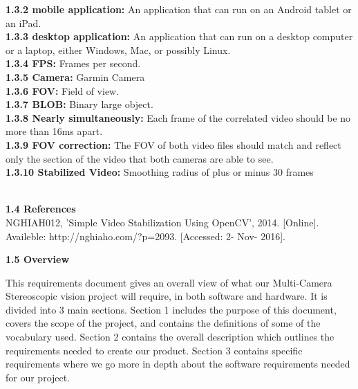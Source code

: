 \documentclass[10pt,draftclsnofoot,onecolumn]{IEEEtran}
\begin{document}
\textbf{1.3.2 mobile application:}   An application that can run on an Android tablet or an iPad.\\
 \vspace{5mm}
\textbf{1.3.3 desktop application:}   An application that can run on a desktop computer or a laptop, either Windows, Mac, or possibly Linux.
 \vspace{5mm}\\
\textbf{1.3.4 FPS:}   Frames per second. 
 \vspace{5mm}\\
 \textbf{1.3.5 Camera:}   Garmin Camera
 \vspace{5mm}\\
 \textbf{1.3.6 FOV:}   Field of view. 
 \vspace{5mm}\\
 \textbf{1.3.7 BLOB:}   Binary large object.  
 \vspace{5mm}\\
 \textbf{1.3.8 Nearly simultaneously:}   Each frame of the correlated video should be no more than 16ms apart.
 \vspace{5mm}\\
 \textbf{1.3.9 FOV correction:}   The FOV of both video files should match and reflect only the section of the video that both cameras are able to see. 
 \vspace{5mm}\\
 \textbf{1.3.10 Stabilized Video:}   Smoothing radius of plus or minus 30 frames

\\
\vspace{5mm}
{\Medium\textbf{1.4 References}}\\
\vspace{5mm}
NGHIAH012, 'Simple Video Stabilization Using OpenCV', 2014. [Online]. Availeble: http://nghiaho.com/?p=2093. [Accessed: 2- Nov- 2016].
\vspace{5mm}

{\Medium\textbf{1.5 Overview}}\\
\vspace{5mm}

This requirements document gives an overall view of what our Multi-Camera Stereoscopic vision project will require, in both software and hardware. It is divided into 3 main sections. Section 1 includes the purpose of this document, covers the scope of the project, and contains the definitions of some of the vocabulary used. Section 2 contains the overall description which outlines the requirements needed to create our product. Section 3 contains specific requirements where we go more in depth about the software requirements needed for our project. 
\\
\vspace{5mm}
\end{document}
